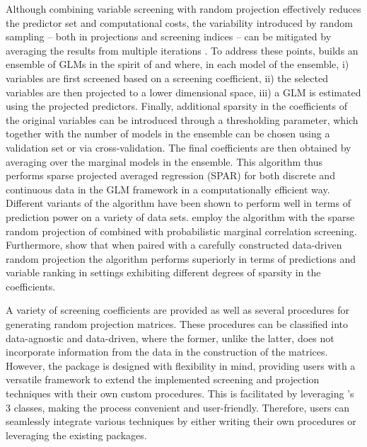 \documentclass[
  article,
  nojss]{jss}
\begin{document}
Although combining variable screening with random projection effectively
reduces the predictor set and computational costs, the variability
introduced by random sampling -- both in projections and screening
indices -- can be mitigated by averaging the results from multiple
iterations \citep{Thanei2017RPforHDR}. To address these points,
 builds an ensemble of GLMs in the spirit of
\citet{Dunson2020TargRandProj} and \citet{parzer2024glms} where, in each
model of the ensemble, i) variables are first screened based on a
screening coefficient, ii) the selected variables are then projected to
a lower dimensional space, iii) a GLM is estimated using the projected
predictors. Finally, additional sparsity in the coefficients of the
original variables can be introduced through a thresholding parameter,
which together with the number of models in the ensemble can be chosen
using a validation set or via cross-validation. The final coefficients
are then obtained by averaging over the marginal models in the ensemble.
This algorithm thus performs sparse projected averaged regression (SPAR)
for both discrete and continuous data in the GLM framework in a
computationally efficient way. Different variants of the algorithm have
been shown to perform well in terms of prediction power on a variety of
data sets. \citet{Dunson2020TargRandProj} employ the algorithm with the
sparse random projection of \citet{ACHLIOPTAS2003JL} combined with
probabilistic marginal correlation screening. Furthermore,
\citet{parzer2024glms} show that when paired with a carefully
constructed data-driven random projection the algorithm performs
superiorly in terms of predictions and variable ranking in settings
exhibiting different degrees of sparsity in the coefficients.

A variety of screening coefficients are provided as well as several
procedures for generating random projection matrices. These procedures
can be classified into data-agnostic and data-driven, where the former,
unlike the latter, does not incorporate information from the data in the
construction of the matrices. However, the package is designed with
flexibility in mind, providing users with a versatile framework to
extend the implemented screening and projection techniques with their
own custom procedures. This is facilitated by leveraging 's
3 classes, making the process convenient and user-friendly.
Therefore, users can seamlessly integrate various techniques by either
writing their own procedures or leveraging the existing 
packages.
\end{document}
